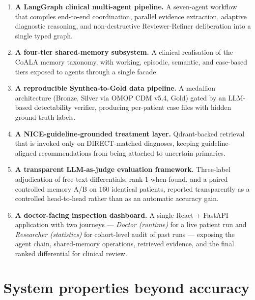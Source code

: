 \begin{enumerate}

  \item \textbf{A LangGraph clinical multi-agent pipeline.} A seven-agent
  workflow that compiles end-to-end coordination, parallel evidence
  extraction, adaptive diagnostic reasoning, and non-destructive
  Reviewer-Refiner deliberation into a single typed graph.

  \item \textbf{A four-tier shared-memory subsystem.} A clinical
  realisation of the CoALA memory taxonomy, with working, episodic,
  semantic, and case-based tiers exposed to agents through a single
  facade.

  \item \textbf{A reproducible Synthea-to-Gold data pipeline.} A medallion
  architecture (Bronze, Silver via OMOP CDM v5.4, Gold) gated by an
  LLM-based detectability verifier, producing per-patient case files with
  hidden ground-truth labels.

  \item \textbf{A NICE-guideline-grounded treatment layer.} Qdrant-backed
  retrieval that is invoked only on DIRECT-matched diagnoses, keeping
  guideline-aligned recommendations from being attached to uncertain
  primaries.

  \item \textbf{A transparent LLM-as-judge evaluation framework.}
  Three-label adjudication of free-text differentials, rank-1-when-found, and
  a paired controlled memory A/B on 160 identical patients, reported
  transparently as a controlled head-to-head rather than as an automatic
  accuracy gain.

  \item \textbf{A doctor-facing inspection dashboard.} A single React +
  FastAPI application with two journeys --- \emph{Doctor (runtime)} for a
  live patient run and \emph{Researcher (statistics)} for cohort-level
  audit of past runs --- exposing the agent chain, shared-memory
  operations, retrieved evidence, and the final ranked differential for
  clinical review.

\end{enumerate}

\section{System properties beyond accuracy}
\label{sec:concl_properties}

